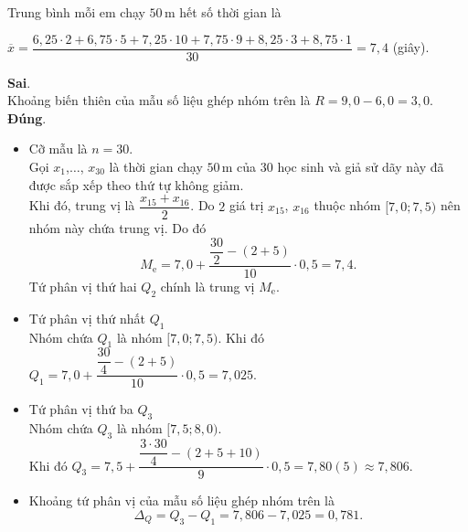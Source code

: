 \begin{ex}
{\begin{itemchoice}
			Trung bình mỗi em chạy $50$\,m hết số thời gian là
			\begin{center}
				$\overline{x}=\dfrac{6{,}25 \cdot 2+6{,}75 \cdot 5+7{,}25 \cdot 10+7{,}75 \cdot 9+8{,}25 \cdot 3+8{,}75 \cdot 1}{30}=7{,}4$ (giây).
			\end{center}
			\itemch \textbf{Sai}.\\
			Khoảng biến thiên của mẫu số liệu ghép nhóm trên là $R=9{,}0-6{,}0=3{,}0$.
			\itemch \textbf{Đúng}.
			\begin{itemize}
				\item Cỡ mẫu là $n=30$.\\
				Gọi $x_{1}$,$\ldots$, $x_{30}$ là thời gian chạy $50$\,m của $30$ học sinh và giả sử dãy này đã được sắp xếp theo thứ tự không giảm.\\
				Khi đó, trung vị là $\dfrac{x_{15}+x_{16}}{2}$. Do $2$ giá trị $x_{15}$, $x_{16}$ thuộc nhóm $[7{,}0;7{,}5)$ nên nhóm này chứa trung vị. Do đó
				\[
				M_{\text{e}}=7{,}0+\dfrac{\dfrac{30}{2}-(2+5)}{10} \cdot 0{,}5=7{,}4.
				\]
				Tứ phân vị thứ hai $Q_{2}$ chính là trung vị $M_{\text{e}}$.
				\item Tứ phân vị thứ nhất $Q_{1}$\\
				Nhóm chứa $Q_{1}$ là nhóm $[7{,}0;7{,}5)$. Khi đó $Q_{1}=7{,}0+\dfrac{\dfrac{30}{4}-(2+5)}{10} \cdot 0{,}5=7{,}025$.
				\item Tứ phân vị thứ ba $Q_{3}$\\
				Nhóm chứa $Q_{3}$ là nhóm $[7{,}5;8{,}0)$.\\
				Khi đó $Q_{3}=7{,}5+\dfrac{\dfrac{3\cdot30}{4}-(2+5+10)}{9} \cdot 0{,}5=7{,}80(5) \approx 7{,}806$.
				\item Khoảng tứ phân vị của mẫu số liệu ghép nhóm trên là  \[\Delta_{Q}=Q_{3}-Q_{1}=7{,}806-7{,}025=0{,}781.\]
			\end{itemize}
		\end{itemchoice}
	}
\end{ex}


